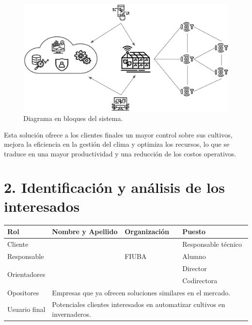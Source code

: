 \documentclass[
11pt, %
codirector, %
]{charter}
\begin{document}
\begin{figure}[htpb]
	\centering
	\includegraphics[width=.85\textwidth]{./Figuras/figura1.png}
	\caption{Diagrama en bloques del sistema.}
	\label{fig:diagBloques}
\end{figure}


Esta solución ofrece a los clientes finales un mayor control sobre sus cultivos, mejora la eficiencia en la gestión del clima y
optimiza los recursos, lo que se traduce en una mayor productividad y una reducción de los costos operativos.


\section{2. Identificación y análisis de los interesados}
\label{sec:interesados}

\begin{table}[ht]
	\begin{tabularx}{\linewidth}{|p{2.15cm}|p{5.8cm}|p{2.1cm}|p{4.1cm}|}
		\hline
		\rowcolor[HTML]{C0C0C0}
		Rol                           & Nombre y Apellido                                                                              & Organización    & Puesto              \\ \hline
		Cliente                       & \clientename                                                                                   & \empclientename & Responsable técnico \\ \hline
		Responsable                   & \authorname                                                                                    & FIUBA           & Alumno              \\ \hline
		\multirow{2}{*}{Orientadores} & \supname                                                                                       & \pertesupname   & Director            \\
		                              & \cosupname                                                                                     & \pertecosupname & Codirectora         \\ \hline
		Opositores                    & \multicolumn{3}{l|}{Empresas que ya ofrecen soluciones similares en el mercado.}                                                       \\ \hline
		Usuario final                 & \multicolumn{3}{l|}{Potenciales clientes interesados en automatizar cultivos en invernaderos.}                                         \\ \hline
	\end{tabularx}
\end{table}
\end{document}
